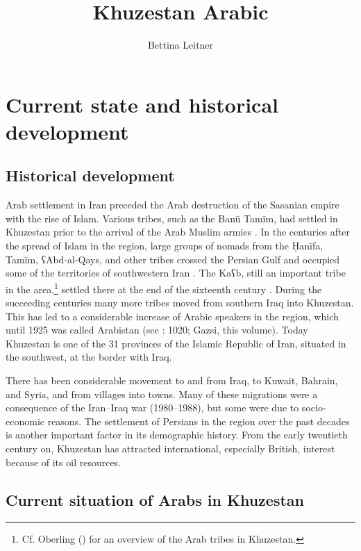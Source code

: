 \documentclass[output=paper,nonflat]{langsci/langscibook}
\author{Bettina Leitner\affiliation{University of Vienna}}
\title{Khuzestan Arabic}
\begin{document}
\maketitle  

\section{Current state and historical development} 
\subsection{Historical development}
Arab settlement in Iran preceded the Arab destruction of the Sasanian empire with the rise of Islam. Various tribes, such as the Banū Tamīm, had settled in Khuzestan prior to the arrival of the Arab Muslim armies \citep[211]{Daniel1986}. In the centuries after the spread of Islam in the region, large groups of nomads from the Ḥanīfa, Tamīm, ʕAbd-al-Qays, and other tribes crossed the Persian Gulf and occupied some of the territories of southwestern Iran \citep[215]{Oberling1986}. The Kaʕb, still an important tribe in the area,\footnote{Cf. Oberling (\citeyear[218]{Oberling1986}) for an overview of the Arab tribes in Khuzestan.} settled there at the end of the sixteenth century \citep[216]{Oberling1986}. During the succeeding centuries many more tribes moved from southern Iraq into Khuzestan. This has led to a considerable increase of Arabic speakers in the region, which until 1925 was called Arabistan (see \citealt{Gazsi2011}: 1020; Gazsi, this volume). Today Khuzestan is one of the 31 provinces of the Islamic Republic of Iran, situated in the southwest, at the border with Iraq. 

There has been considerable movement to and from Iraq, to Kuwait, Bahrain, and Syria, and from villages into towns. Many of these migrations were a consequence of the Iran–Iraq war (1980–1988), but some were due to socio-economic reasons. The settlement of Persians in the region over the past decades \citep[1020]{Gazsi2011} is another important factor in its demographic history. From the early twentieth century on, Khuzestan has attracted international, especially British, interest because of its oil resources. 

\subsection{Current situation of Arabs in Khuzestan}
\end{document}

